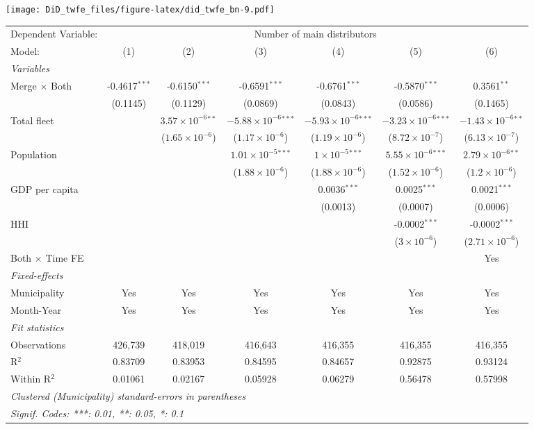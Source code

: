 \documentclass[
]{article}
\begin{document}
\texttt{[image: DiD\_twfe\_files/figure-latex/did\_twfe\_bn-9.pdf]}

\begin{tabular}{lcccccc}
\tabularnewline\midrule\midrule
Dependent Variable:&\multicolumn{6}{c}{Number of main distributors}\\
Model:&(1) & (2) & (3) & (4) & (5) & (6)\\
\midrule \emph{Variables}&   &   &   &   &   &  \\
Merge $\times $ Both & -0.4617$^{***}$ & -0.6150$^{***}$ & -0.6591$^{***}$ & -0.6761$^{***}$ & -0.5870$^{***}$ & 0.3561$^{**}$\\
  &(0.1145) & (0.1129) & (0.0869) & (0.0843) & (0.0586) & (0.1465)\\
Total fleet &    & $3.57\times 10^{-6}$$^{**}$ & $-5.88\times 10^{-6}$$^{***}$ & $-5.93\times 10^{-6}$$^{***}$ & $-3.23\times 10^{-6}$$^{***}$ & $-1.43\times 10^{-6}$$^{**}$\\
  &   & ($1.65\times 10^{-6}$) & ($1.17\times 10^{-6}$) & ($1.19\times 10^{-6}$) & ($8.72\times 10^{-7}$) & ($6.13\times 10^{-7}$)\\
Population &    &    & $1.01\times 10^{-5}$$^{***}$ & $1\times 10^{-5}$$^{***}$ & $5.55\times 10^{-6}$$^{***}$ & $2.79\times 10^{-6}$$^{**}$\\
  &   &    & ($1.88\times 10^{-6}$) & ($1.88\times 10^{-6}$) & ($1.52\times 10^{-6}$) & ($1.2\times 10^{-6}$)\\
GDP per capita &    &    &    & 0.0036$^{***}$ & 0.0025$^{***}$ & 0.0021$^{***}$\\
  &   &    &    & (0.0013) & (0.0007) & (0.0006)\\
HHI &    &    &    &    & -0.0002$^{***}$ & -0.0002$^{***}$\\
  &   &    &    &    & ($3\times 10^{-6}$) & ($2.71\times 10^{-6}$)\\
Both $\times$ Time FE &  &  &  &  &  & Yes\\
\midrule \emph{Fixed-effects}&   &   &   &   &   &  \\
Municipality & Yes & Yes & Yes & Yes & Yes & Yes\\
Month-Year & Yes & Yes & Yes & Yes & Yes & Yes\\
\midrule \emph{Fit statistics}&  & & & & & \\
Observations & 426,739&418,019&416,643&416,355&416,355&416,355\\
R$^2$ & 0.83709&0.83953&0.84595&0.84657&0.92875&0.93124\\
Within R$^2$ & 0.01061&0.02167&0.05928&0.06279&0.56478&0.57998\\
\midrule\midrule\multicolumn{7}{l}{\emph{Clustered (Municipality) standard-errors in parentheses}}\\
\multicolumn{7}{l}{\emph{Signif. Codes: ***: 0.01, **: 0.05, *: 0.1}}\\
\end{tabular}
\end{document}
